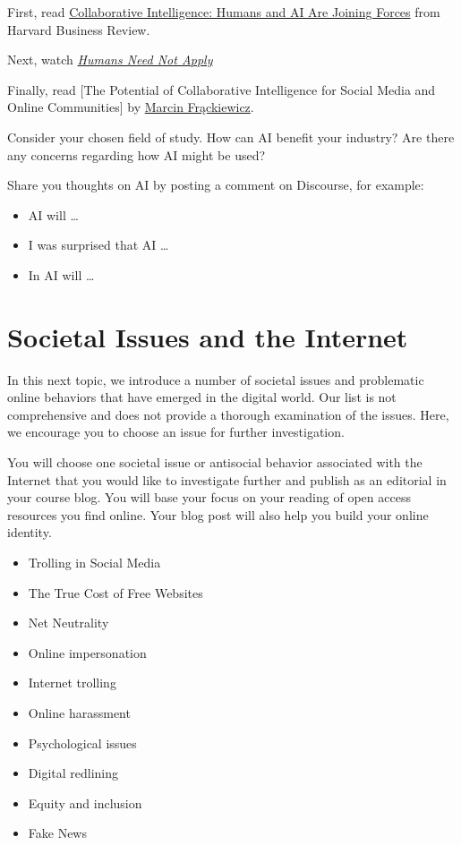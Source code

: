 \documentclass[
]{book}
\providecommand{\tightlist}{%
  \setlength{\itemsep}{0pt}\setlength{\parskip}{0pt}}
\theoremstyle{definition}
\theoremstyle{definition}
\theoremstyle{definition}
\theoremstyle{definition}
\theoremstyle{remark}
\begin{document}
\begin{reflect}
First, read \href{https://hbr.org/2018/07/collaborative-intelligence-humans-and-ai-are-joining-forces}{Collaborative Intelligence: Humans and AI Are Joining Forces} from Harvard Business Review.

Next, watch \href{https://www.youtube.com/watch?v=7Pq-S557XQU}{\emph{Humans Need Not Apply}}

Finally, read {[}The Potential of Collaborative Intelligence for Social Media and Online Communities{]} by \href{https://ts2.space/en/author/marcin/}{Marcin Frąckiewicz}.

Consider your chosen field of study. How can AI benefit your industry? Are there any concerns regarding how AI might be used?

Share you thoughts on AI by posting a comment on Discourse, for example:

\begin{itemize}
\tightlist
\item
  AI will \ldots{}\\
\item
  I was surprised that AI \ldots{}\\
\item
  In AI will \ldots{}
\end{itemize}
\end{reflect}

\hypertarget{societal-issues-and-the-internet}{%
\section{Societal Issues and the Internet}\label{societal-issues-and-the-internet}}

In this next topic, we introduce a number of societal issues and problematic online behaviors that have emerged in the digital world. Our list is not comprehensive and does not provide a thorough examination of the issues. Here, we encourage you to choose an issue for further investigation.

You will choose one societal issue or antisocial behavior associated with the Internet that you would like to investigate further and publish as an editorial in your course blog. You will base your focus on your reading of open access resources you find online. Your blog post will also help you build your online identity.

\begin{itemize}
\tightlist
\item
  Trolling in Social Media
\item
  The True Cost of Free Websites
\item
  Net Neutrality
\item
  Online impersonation
\item
  Internet trolling
\item
  Online harassment
\item
  Psychological issues
\item
  Digital redlining
\item
  Equity and inclusion
\item
  Fake News
\end{itemize}
\end{document}
